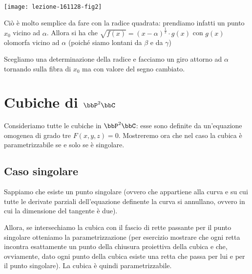 \begin{center}
  \texttt{[image: lezione-161128-fig2]}
\end{center}

Ciò è molto semplice da fare con la radice quadrata: prendiamo infatti
un punto $x_0$ vicino ad $\alpha$. Allora si ha che
$\sqrt{f(x)} = (x - \alpha)^{\frac{1}{2}} \cdot g(x)$ con $g(x)$
olomorfa vicino ad $\alpha$ (poiché siamo lontani da $\beta$ e da
$\gamma$)

Scegliamo una determinazione della radice e facciamo un giro attorno ad
$\alpha$ tornando sulla fibra di $x_0$ ma con valore del segno cambiato.


\section{Cubiche di $\bbP^2\bbC$}
Consideriamo tutte le cubiche in $\bbP^2\bbC$: esse sono definite da
un'equazione omogenea di grado tre $F(x, y, z) = 0$. Mostreremo ora che
nel caso la cubica è parametrizzabile se e solo se è singolare.


\subsection{Caso singolare}
Sappiamo che esiste un punto singolare (ovvero che appartiene alla curva
e su cui tutte le derivate parziali dell'equazione definente la curva si
annullano, ovvero in cui la dimensione del tangente è due).

Allora, se intersechiamo la cubica con il fascio di rette passante per
il punto singolare otteniamo la parametrizzazione (per esercizio
mostrare che ogni retta incontra esattamente un punto della chiusura
proiettiva della cubica e che, ovviamente, dato ogni punto della cubica
esiste una retta che passa per lui e per il punto singolare). La cubica
è quindi parametrizzabile.


